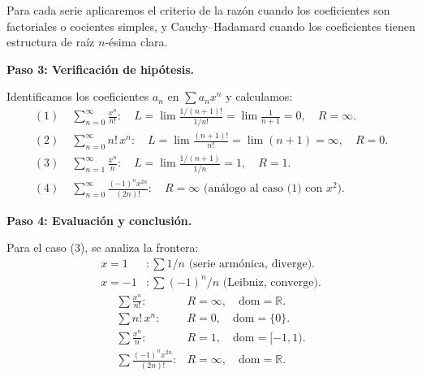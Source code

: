 \begin{example}
\begin{myproof}
Para cada serie aplicaremos el criterio de la razón cuando los
coeficientes son factoriales o cocientes simples, y Cauchy--Hadamard
cuando los coeficientes tienen estructura de raíz $n$-ésima clara.

\textbf{Paso 3: Verificación de hipótesis.}

Identificamos los coeficientes $a_n$ en $\sum a_n x^n$ y calculamos:
\begin{align*}
    (1)\;& \sum_{n=0}^\infty \frac{x^n}{n!}\colon\quad
        L = \lim\frac{1/(n+1)!}{1/n!} = \lim\frac{1}{n+1} = 0,
        \quad R = \infty.\\
    (2)\;& \sum_{n=0}^\infty n!\,x^n\colon\quad
        L = \lim\frac{(n+1)!}{n!} = \lim(n+1) = \infty,
        \quad R = 0.\\
    (3)\;& \sum_{n=1}^\infty \frac{x^n}{n}\colon\quad
        L = \lim\frac{1/(n+1)}{1/n} = 1,\quad R = 1.\\
    (4)\;& \sum_{n=0}^\infty \frac{(-1)^n x^{2n}}{(2n)!}\colon\quad
        R = \infty \text{ (análogo al caso (1) con }x^2\text{)}.
\end{align*}

\textbf{Paso 4: Evaluación y conclusión.}

Para el caso (3), se analiza la frontera:
\begin{align*}
    x=1&\colon \sum 1/n \text{ (serie armónica, diverge).}\\
    x=-1&\colon \sum (-1)^n/n \text{ (Leibniz, converge)}.
\end{align*}
\[
    \boxed{
    \begin{array}{ll}
        \displaystyle\sum \frac{x^n}{n!}: & R = \infty,\quad
            \text{dom} = \mathbb{R}.\\[6pt]
        \displaystyle\sum n!\,x^n: & R = 0,\quad
            \text{dom} = \{0\}.\\[6pt]
        \displaystyle\sum \frac{x^n}{n}: & R = 1,\quad
            \text{dom} = [-1,1).\\[6pt]
        \displaystyle\sum \frac{(-1)^n x^{2n}}{(2n)!}: & R = \infty,\quad
            \text{dom} = \mathbb{R}.
    \end{array}}
\]
\end{myproof}
\end{example}

